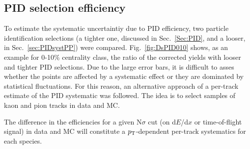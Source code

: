 \subsection{PID selection efficiency}
\label{sec:PIDsystAA}
To estimate the systematic uncertaintiy due to PID efficiency,
two particle identification selections (a tighter one, discussed in Sec.~\ref{Sec:PID}, and a 
looser, in Sec.~\ref{sec:PIDsystPP}) were compared. Fig.~\ref{fig:DsPID010} 
shows, as an example for 0-10\% centrality class, the ratio of the corrected yields 
with looser and tighter PID selections. Due to the large error bars, it is difficult to asses
whether the points are affected by a systematic effect
or they are dominated by statistical fluctuations.
For this reason, an alternative approach of a per-track estimate of the PID
systematic was followed. The idea is to select samples of kaon and pion tracks in data and
MC. 

The difference in the efficiencies for a given N$\sigma$ cut (on d$E$/d$x$ or 
time-of-flight signal) in data and MC will
constitute a $p_{\rm T}$-dependent per-track systematics for each species.

